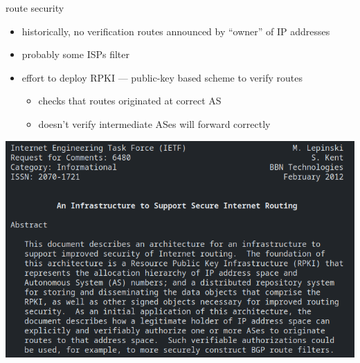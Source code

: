 \begin{frame}{route security}
    \begin{itemize}
    \item historically, no verification routes announced by ``owner'' of IP addresses
    \vspace{.5cm}
    \item probably some ISPs filter
    \item effort to deploy RPKI --- public-key based scheme to verify routes
        \begin{itemize}
        \item checks that routes originated at correct AS
        \item doesn't verify intermediate ASes will forward correctly
        \end{itemize}
    \end{itemize}
\end{frame}

\begin{frame}{}
\includegraphics[height=\textheight]{rpki-rfc}
\end{frame}
